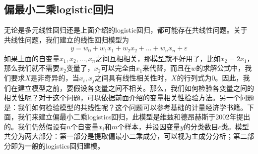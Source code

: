     \subsection{偏最小二乘logistic回归}
        \par
        无论是多元线性回归还是上面介绍的logistic回归，都可能存在共线性问题。关于共线性问题，我们建立的线性回归模型为
        \begin{align*}
        y = w_0 +w_1x_1+w_2x_2+\dots+w_nx_n+\varepsilon
        \end{align*}
        如果上面的自变量$x_1,x_2,\dots,x_n$之间互相相关，那模型就不好用了，比如$x_2 = 2x_1$，那么我们就不需要$x_2$变量了，$x_2$可以完全由$x_1$来代替，而且在$w$的求解公式中，我们要求$X$是非奇异的，当$x_i,x_j$之间具有线性相关性时，$X$的行列式为0。因此，我们在建立模型之前，要假设各变量之间不相关。那么，我们如何检验各变量之间的相关性呢？对于这个问题，可以依据前面介绍的变量相关性检验方法。另一个问题是：我们如何检验模型的共线性呢？这个问题可以参考基础的计量经济学书籍。下面，我们来建立偏最小二乘logistics回归，此模型是维兹和德昂赫斯于2002年提出的。我们仍然假设有$n$个自变量$x_i$和$m$个样本，并设因变量$y$的分类数目$c$类。模型共分为两大部分：第一部分是提取偏最小二乘成分，可以视为主成分分析；第二部分即为一般的logistics回归建模。

